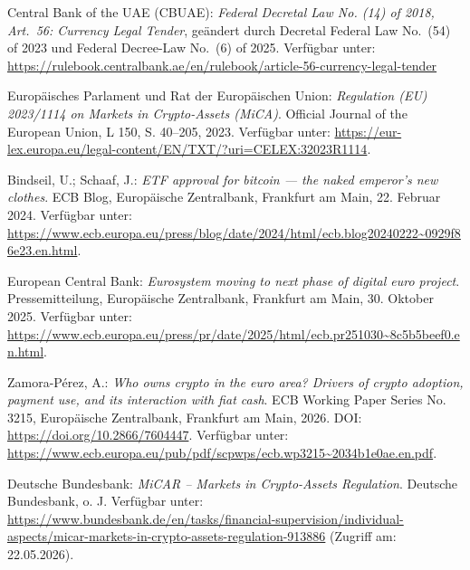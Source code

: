 \begin{thebibliography}{}
\label{CBUAE2025}
Central Bank of the UAE (CBUAE): \textit{Federal Decretal Law No. (14) of 2018, Art.~56: Currency Legal Tender}, geändert durch Decretal Federal Law No.~(54) of 2023 und Federal Decree-Law No.~(6) of 2025. Verfügbar unter: \url{https://rulebook.centralbank.ae/en/rulebook/article-56-currency-legal-tender}

\label{MiCA2023}
Europäisches Parlament und Rat der Europäischen Union: \textit{Regulation (EU) 2023/1114 on Markets in Crypto-Assets (MiCA)}. Official Journal of the European Union, L 150, S. 40--205, 2023. Verfügbar unter: \url{https://eur-lex.europa.eu/legal-content/EN/TXT/?uri=CELEX:32023R1114}.

\label{Bindseil2024}
Bindseil, U.; Schaaf, J.: \textit{ETF approval for bitcoin — the naked emperor's new clothes}. ECB Blog, Europäische Zentralbank, Frankfurt am Main, 22. Februar 2024. Verfügbar unter: \url{https://www.ecb.europa.eu/press/blog/date/2024/html/ecb.blog20240222~0929f86e23.en.html}.

\label{ECB2025}
European Central Bank: \textit{Eurosystem moving to next phase of digital euro project}. Pressemitteilung, Europäische Zentralbank, Frankfurt am Main, 30. Oktober 2025. Verfügbar unter: \url{https://www.ecb.europa.eu/press/pr/date/2025/html/ecb.pr251030~8c5b5beef0.en.html}.

\label{Zamora2026}
Zamora-Pérez, A.: \textit{Who owns crypto in the euro area? Drivers of crypto adoption, payment use, and its interaction with fiat cash}. ECB Working Paper Series No. 3215, Europäische Zentralbank, Frankfurt am Main, 2026. DOI: \url{https://doi.org/10.2866/7604447}. Verfügbar unter: \url{https://www.ecb.europa.eu/pub/pdf/scpwps/ecb.wp3215~2034b1e0ae.en.pdf}.

\label{BundesbankMiCAR}
Deutsche Bundesbank: \textit{MiCAR -- Markets in Crypto-Assets Regulation}. Deutsche Bundesbank, o. J. Verfügbar unter: \url{https://www.bundesbank.de/en/tasks/financial-supervision/individual-aspects/micar-markets-in-crypto-assets-regulation-913886} (Zugriff am: 22.05.2026).

\end{thebibliography}